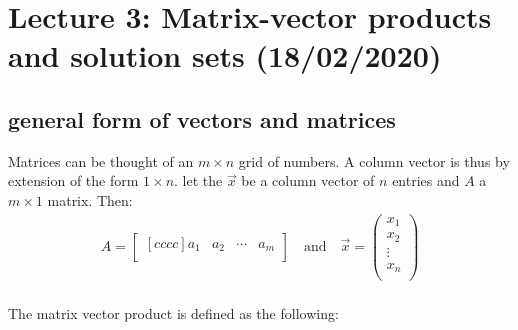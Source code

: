 \documentclass[11pt, a4paper]{article}
\begin{document}
\setcounter{section}{2}
\section{Lecture 3: Matrix-vector products and solution sets (18/02/2020)}

\subsection{general form of vectors and matrices}
Matrices can be thought of an $m \times n$ grid of numbers. A column vector is thus by extension
of the form $1 \times n$. let the $\vec{x}$ be a column vector of $n$ entries and $A$ a $m \times 1$ matrix.  
Then: 
\begin{align*}
  A = 
  \begin{bmatrix}[cccc]
    a_1 & a_2 & \cdots & a_m\\
  \end{bmatrix}
  \quad \text{and} \quad 
  \vec{x} = 
  \begin{pmatrix}
    x_1\\
    x_2\\
    \vdots \\
    x_n\\
  \end{pmatrix}
\end{align*}
\\
The matrix vector product is defined as the following:
\end{document}
